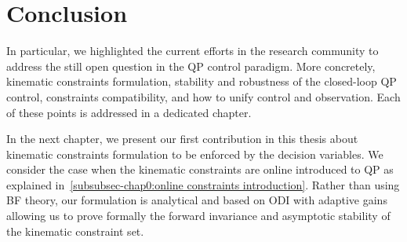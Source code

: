 \section{Conclusion}

In particular, we highlighted the current efforts in the research community to address the still open question in the QP control paradigm. More concretely, kinematic constraints formulation, stability and robustness of the closed-loop QP control, constraints compatibility, and how to unify control and observation. Each of these points is  addressed in a dedicated chapter. 

In the next chapter, we  present our first contribution in this thesis about kinematic constraints formulation to be enforced by the decision variables. We consider the case when the kinematic constraints are online introduced to QP as explained in~\cref{subsubsec-chap0:online constraints introduction}. Rather than using BF theory, our formulation is analytical and based on ODI with adaptive gains allowing us to prove formally the forward invariance and asymptotic stability of the kinematic constraint set. 


